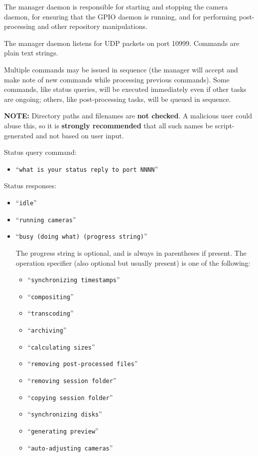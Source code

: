 The manager daemon is responsible for starting and stopping the camera daemon,
for ensuring that the GPIO daemon is running, and for performing 
post-processing and other repository manipulations.

The manager daemon listens for UDP packets on port 10999. Commands are
plain text strings.

Multiple commands may be issued in sequence (the manager will accept and
make note of new commands while processing previous commands). Some commands,
like status queries, will be executed immediately even if other tasks are
ongoing; others, like post-processing tasks, will be queued in sequence.

\textbf{NOTE:} Directory paths and filenames are \textbf{not checked}. A
malicious user could abuse this, so it is \textbf{strongly recommended} that 
all such names be script-generated and not based on user input.

Status query command:
\begin{itemize}
\item ``\verb+what is your status reply to port NNNN+''
\end{itemize}

\clearpage
Status responses:
\begin{itemize}
\item ``\verb+idle+''
\item ``\verb+running cameras+''
%
\item ``\verb+busy (doing what) (progress string)+''

The progress string is optional, and is always in parentheses if present.
The operation specifier (also optional but usually present) is one of the
following:
\begin{itemize}
\item ``\verb+synchronizing timestamps+''
\item ``\verb+compositing+''
\item ``\verb+transcoding+''
\item ``\verb+archiving+''
\item ``\verb+calculating sizes+''
\item ``\verb+removing post-processed files+''
\item ``\verb+removing session folder+''
\item ``\verb+copying session folder+''
\item ``\verb+synchronizing disks+''
\item ``\verb+generating preview+''
\item ``\verb+auto-adjusting cameras+''
\end{itemize}
%
\end{itemize}

